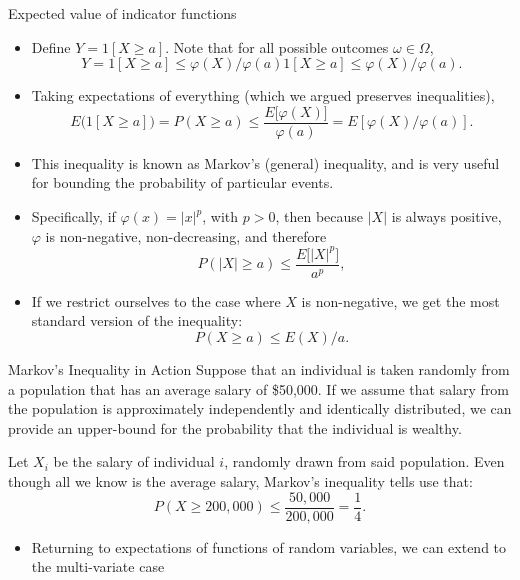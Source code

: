 \begin{frame}[allowframebreaks]{Expected value of indicator functions}
\begin{itemize}
    \item Define $Y = 1[X \geq a]$. Note that for all possible outcomes $\omega \in \Omega$, 
    $$
    Y = 1[X \geq a] \leq \varphi(X) / \varphi(a) 1[X \geq a] \leq \varphi(X) / \varphi(a).
    $$
    \item Taking expectations of everything (which we argued preserves inequalities),
    $$
    E\big(1[X \geq a]\big) = P(X \geq a) \leq \frac{E\big[\varphi(X)\big]}{\varphi(a)} = E\left[\varphi(X) / \varphi(a)\right].
    $$
    \item This inequality is known as \alert{Markov's (general) inequality}, and is very useful for bounding the probability of particular events. 
    \item Specifically, if $\varphi(x) = |x|^p$, with $p > 0$, then because $|X|$ is always positive, $\varphi$ is non-negative, non-decreasing, and therefore
    $$
    P(|X| \geq a) \leq \frac{E\big[|X|^p\big]}{a^p},
    $$
    \item If we restrict ourselves to the case where $X$ is non-negative, we get the most standard version of the inequality:
    $$
    P(X \geq a) \leq E(X) / a.
    $$
  \end{itemize}

  \framebreak

  \begin{exampleblock}{Markov's Inequality in Action}
    Suppose that an individual is taken randomly from a population that has an average salary of \$50,000. If we assume that salary from the population is approximately independently and identically distributed, we can provide an upper-bound for the probability that the individual is wealthy.
    
    Let $X_i$ be the salary of individual $i$, randomly drawn from said population. Even though all we know is the average salary, Markov's inequality tells use that:
    $$
    P(X \geq 200,000) \leq \frac{50,000}{200,000} = \frac{1}{4}. 
    $$
  \end{exampleblock}

  \framebreak

  \begin{itemize}
    \item Returning to expectations of functions of random variables, we can extend to the multi-variate case
  \end{itemize}
  

\end{frame}
